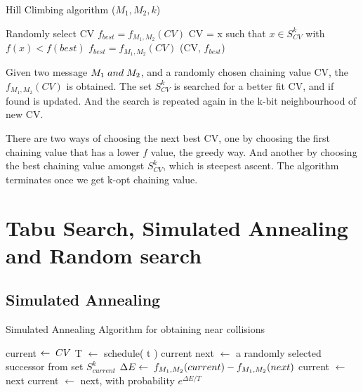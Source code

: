 \begin{algorithm}
  \caption{ Hill Climbing algorithm ($M_{1}, M_{2}, k$) \cite{00029}}
  \begin{algorithmic}[1]
    \State Randomly select CV
    \State $f_{best} = f_{M_{1}, M_{2}}(CV)$
    \State {}
    \State CV = x such that $x \in S^{k}_{CV}$ with $f(x) < f(best)$
    \State $f_{best} = f_{M_{1}, M_{2}}(CV)$
    \State \EndWhile
    \State \Return (CV, $f_{best}$)
  \end{algorithmic}
\end{algorithm}

Given two message $M_{1} \thickspace and \thickspace M_{2}$, and a randomly chosen chaining value CV, the $f_{M_{1}, M_{2}}(CV)$
is obtained. The set $S^{k}_{CV}$ is searched for a better fit CV, and if found is updated. And the search is repeated again
in the k-bit neighbourhood of new CV.

There are two ways of choosing the next best CV, one by choosing the first chaining value that has a lower $f$ value, the
greedy way. And another by choosing the best chaining value amongst $S^{k}_{CV}$, which is steepest ascent. The algorithm
terminates once we get k-opt chaining value.

\section{Tabu Search, Simulated Annealing and Random search}

\subsection{Simulated Annealing}

\begin{algorithm}
  \caption{ Simulated Annealing Algorithm for obtaining near collisions }
  \begin{algorithmic}[1]
      \State current $\gets \thickspace CV$
        \State T $\gets$ schedule( t )
          \State \Return current
        \EndIf
        \State next $\gets$ a randomly selected successor from set $S^{k}_{current}$
        \State $\Delta E \gets  \thickspace f_{M_{1}, M_{2}}(current) - f_{M_{1}, M_{2}}(next)$
          \State current $\gets$ next
        \Else
          \State current $\gets$ next, with probability $e^{\Delta E / T}$
        \EndIf
      \EndFor
    \EndFunction
  \end{algorithmic}
\end{algorithm}

